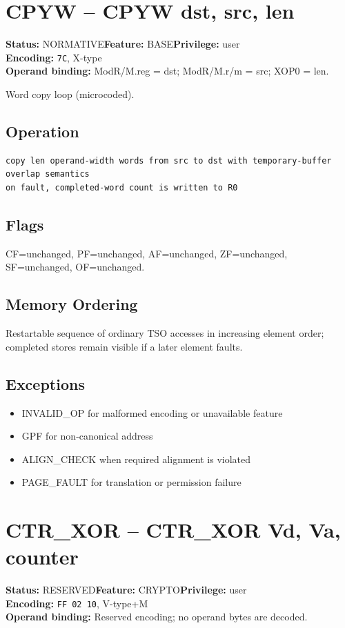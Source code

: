 \documentclass[10pt]{article}
\begin{document}
\section{CPYW -- CPYW dst, src, len}
\textbf{Status:} NORMATIVE\quad \textbf{Feature:} BASE\quad \textbf{Privilege:} user\\
\textbf{Encoding:} \texttt{7C}, X-type\\
\textbf{Operand binding:} ModR/M.reg = dst; ModR/M.r/m = src; XOP0 = len.

Word copy loop (microcoded).

\subsection*{Operation}
\begin{lstlisting}
copy len operand-width words from src to dst with temporary-buffer overlap semantics
on fault, completed-word count is written to R0
\end{lstlisting}
\subsection*{Flags}
CF=unchanged, PF=unchanged, AF=unchanged, ZF=unchanged, SF=unchanged, OF=unchanged.
\subsection*{Memory Ordering}
Restartable sequence of ordinary TSO accesses in increasing element order; completed stores remain visible if a later element faults.
\subsection*{Exceptions}
\begin{itemize}
\item INVALID\_OP for malformed encoding or unavailable feature
\item GPF for non-canonical address
\item ALIGN\_CHECK when required alignment is violated
\item PAGE\_FAULT for translation or permission failure
\end{itemize}
\clearpage

\section{CTR\_XOR -- CTR\_XOR Vd, Va, counter}
\textbf{Status:} RESERVED\quad \textbf{Feature:} CRYPTO\quad \textbf{Privilege:} user\\
\textbf{Encoding:} \texttt{FF 02 10}, V-type+M\\
\textbf{Operand binding:} Reserved encoding; no operand bytes are decoded.
\end{document}
